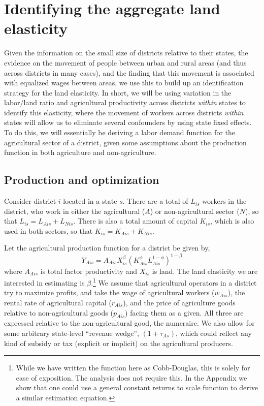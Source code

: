 \documentclass[11pt]{article}
\begin{document}
\section{Identifying the aggregate land elasticity}\label{SEC_agmodel}
Given the information on the small size of districts relative to their states, the evidence on the movement of people between urban and rural areas (and thus across districts in many cases), and the finding that this movement is associated with equalized wages between areas, we use this to build up an identification strategy for the land elasticity. In short, we will be using variation in the labor/land ratio and agricultural productivity across districts \textit{within} states to identify this elasticity, where the movement of workers across districts \textit{within} states will allow us to eliminate several confounders by using state fixed effects. To do this, we will essentially be deriving a labor demand function for the agricultural sector of a district, given some assumptions about the production function in both agriculture and non-agriculture.

\subsection{Production and optimization}
Consider district $i$ located in a state $s$. There are a total of $L_{is}$ workers in the district, who work in either the agricultural ($A$) or non-agricultural sector ($N$), so that $L_{is} = L_{Ais} + L_{Nis}$. There is also a total amount of capital $K_{is}$, which is also used in both sectors, so that $K_{is} = K_{Ais} + K_{Nis}$.

Let the agricultural production function for a district be given by,
\begin{equation}
Y_{Ais} = A_{Ais} X_{is}^{\beta} \left(K_{Ais}^{\phi}L_{Ais}^{1-\phi}\right)^{1-\beta} \label{EQ_production}
\end{equation}
where $A_{Ais}$ is total factor productivity and $X_{is}$ is land. The land elasticity we are interested in estimating is $\beta$.\footnote{While we have written the function here as Cobb-Douglas, this is solely for ease of exposition. The analysis does not require this. In the Appendix we show that one could use a general constant returns to scale function to derive a similar estimation equation.} We assume that agricultural operators in a district try to maximize profits, and take the wage of agricultural workers ($w_{Ais}$), the rental rate of agricultural capital ($r_{Ais}$), and the price of agriculture goods relative to non-agricultural goods ($p_{Ais}$) facing them as a given. All three are expressed relative to the non-agricultural good, the numeraire. We also allow for some arbitrary state-level ``revenue wedge'', $(1+\tau_{As})$, which could reflect any kind of subsidy or tax (explicit or implicit) on the agricultural producers. 
\end{document}
